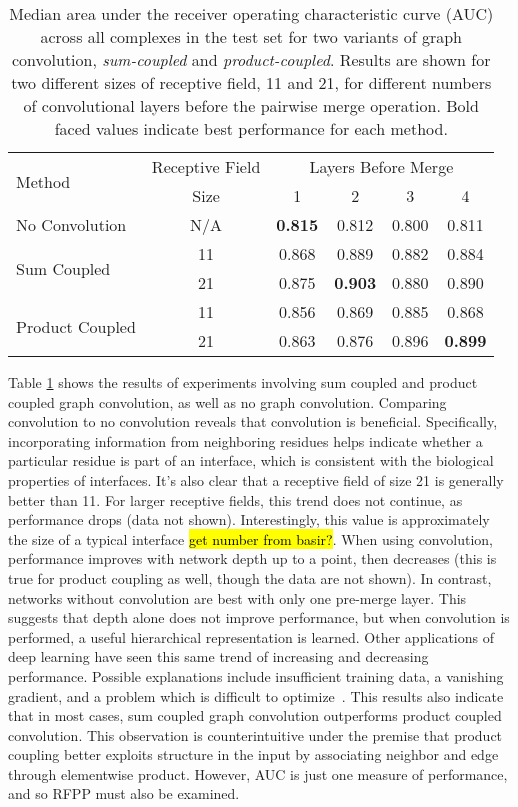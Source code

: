\begin{table}
	\begin{center}
		\begin{tabular}{lccccc}
			\toprule
			\multirow{2}{*}{Method} &
			Receptive Field & \multicolumn{4}{c}{Layers Before Merge} \\
			& Size & 1 & {2} & {3} & {4} \\
			\midrule
			No Convolution & N/A & \textbf{0.815} & 0.812 & 0.800 & 0.811  \\\cline{1-6}
			\multirow{2}{*}{Sum Coupled} & 11 & 0.868 & 0.889 & 0.882 & 0.884 \\
			& 21 & 0.875 & \textbf{0.903} & 0.880 & 0.890 \\\cline{1-6}
			\multirow{2}{*}{Product Coupled} & 11 & 0.856 & 0.869 & 0.885 & 0.868 \\
			& 21 & 0.863 & 0.876 & 0.896 & \textbf{0.899} \\
			\bottomrule
		\end{tabular}
		\caption{Median area under the receiver operating characteristic curve (AUC) across all complexes in the test set for two variants of graph convolution, \textit{sum-coupled} and \textit{product-coupled}. Results are shown for two different sizes of receptive field, 11 and 21, for different numbers of convolutional layers before the pairwise merge operation. Bold faced values indicate best performance for each method.}
		\label{tab:med_auc}
	\end{center}
\end{table}

Table \ref{tab:med_auc} shows the results of experiments involving sum coupled and product coupled graph convolution, as well as no graph convolution.
Comparing convolution to no convolution reveals that convolution is beneficial.
Specifically, incorporating information from neighboring residues helps indicate whether a particular residue is part of an interface, which is consistent with the biological properties of interfaces.
It's also clear that a receptive field of size 21 is generally better than 11.
For larger receptive fields, this trend does not continue, as performance drops (data not shown).
Interestingly, this value is approximately the size of a typical interface \hl{get number from basir?}.
When using convolution, performance improves with network depth up to a point, then decreases (this is true for product coupling as well, though the data are not shown).
In contrast, networks without convolution are best with only one pre-merge layer.
This suggests that depth alone does not improve performance, but when convolution is performed, a useful hierarchical representation is learned.
Other applications of deep learning have seen this same trend of increasing and decreasing performance.
Possible explanations include insufficient training data, a vanishing gradient, and a problem which is difficult to optimize~\cite{he2015}.
This results also indicate that in most cases, sum coupled graph convolution outperforms product coupled convolution.
This observation is counterintuitive under the premise that product coupling better exploits structure in the input by associating neighbor and edge through elementwise product.
However, AUC is just one measure of performance, and so RFPP must also be examined.
	
